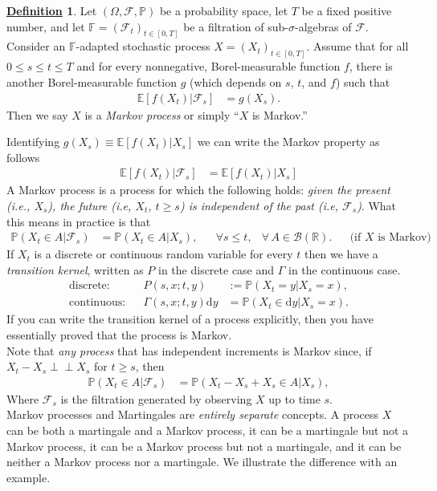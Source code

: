 \documentclass[12pt]{book}
\numberwithin{equation}{chapter}
\theoremstyle{plain}
\numberwithin{theorem}{section}
\theoremstyle{definition}
\newtheorem{definition}[theorem]{\underline{Definition}}
\numberwithin{exercise}{chapter}
\newcommand{\<}{\langle}
\renewcommand{\>}{\rangle}
\renewcommand{\(}{\left(}
\renewcommand{\)}{\right)}
\renewcommand{\[}{\left[}
\renewcommand{\]}{\right]}
\newcommand\Eb{\mathds{E}}
\newcommand\Fb{\mathds{F}}
\newcommand\Pb{\mathds{P}}
\newcommand\Rb{\mathds{R}}
\newcommand\Bc{\mathscr{B}}
\newcommand\Fc{\mathscr{F}}
\newcommand\Om{\Omega}
\newcommand\sig{\sigma}
\newcommand\Gam{\Gamma}
\newcommand{\ind}{\perp \! \! \! \perp}
\newcommand\dd{\mathrm{d}}
\begin{document}
\begin{definition}
\label{def:markov}
Let  $(\Om,\Fc,\Pb)$  be a probability space, let $T$ be a fixed positive number, and let $\Fb=(\Fc_t)_{t \in [0,T]}$ be a filtration of sub-$\sig$-algebras of $\Fc$.
Consider an $\Fb$-adapted stochastic process $X=(X_t)_{t \in [0,T]}$. Assume that for all $0 \leq s \leq t \leq T$ and for every nonnegative, Borel-measurable function $f$, there is another Borel-measurable function $g$ (which depends on $s$, $t$, and $f$) such that
\begin{align}
\Eb[ f(X_t) | \Fc_s ]
	&=	g(X_s) .
\end{align}
Then we say $X$ is a \emph{Markov process} or simply ``$X$ is Markov.''
\end{definition}

\noindent
Identifying $g(X_s) \equiv \Eb[ f(X_t) | X_s ]$ we can write the Markov property as follows
\begin{align}
\Eb[ f(X_t) | \Fc_s ]
	&=	\Eb[ f(X_t) | X_s ]
\end{align}
A Markov process is a process for which the following holds: \emph{given the present (i.e., $X_s$), the future (i.e, $X_t$, $t \geq s$) is independent of the past (i.e, $\Fc_s$)}.  What this means in practice is that 
\begin{align}
\Pb( X_t \in A | \Fc_s )
	&=	\Pb(X_t \in A | X_s) , &
	&		\forall s \leq t ,
	&		\forall \, A \in \Bc(\Rb) . &
	&		\text{(if $X$ is Markov)} \label{eq:markov.prop}
\end{align}
If $X_t$ is a discrete or continuous random variable for every $t$ then we have a \emph{transition kernel}, written as $P$ in the discrete case and $\Gam$ in the continuous case.
\begin{align}
\text{discrete}:&&
P(s,x;t,y)
	&:= \Pb(X_t = y | X_s = x) , \\
\text{continuous}:&&
\Gam(s,x;t,y) \dd y
	&=	\Pb(X_t \in \dd y | X_s = x) .
\end{align}
If you can write the transition kernel of a process explicitly, then you have essentially proved that the process is Markov.
\\[0.5em]
Note that \emph{any process} that has independent increments is Markov since, if $X_t - X_s \ind X_s$ for $t \geq s$, then
\begin{align}
\Pb( X_t \in A | \Fc_s)
	&=	\Pb( X_t - X_s + X_s \in A | X_s) ,
\end{align}
Where $\Fc_s$ is the filtration generated by observing $X$ up to time $s$.
\\[0.5em]
Markov processes and Martingales are \emph{entirely separate} concepts.  A process $X$ can be both a martingale and a Markov process, it can be a martingale but not a Markov process, it can be a Markov process but not a martingale, and it can be neither a Markov process nor a martingale.  We illustrate the difference with an example.
\end{document}
